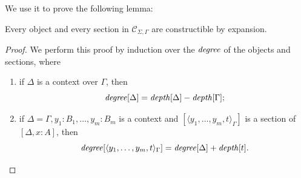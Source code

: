 We use it to prove the following lemma:
\begin{lemma} \label{lemma:exhaustivity-for-docs}
    Every object and every section in $\mathcal{C}_{\Sigma, \Gamma}$ are constructible by expansion.
\end{lemma}
\begin{proof}
    We perform this proof by induction over the $\operatorname{\mathit{degree}}$ of the objects and sections, where 
    \begin{enumerate}
        \item if $\Delta$ is a context over $\Gamma$, then \[
            \operatorname{\mathit{degree}}[\Delta] = \operatorname{\mathit{depth}}[\Delta] - \operatorname{\mathit{depth}}[\Gamma];
        \]
        \item if $\Delta = \Gamma, y_1 \colon B_1, \dots, y_m \colon B_m$ is a context and 
            $[\langle y_1, \dots, y_m, t \rangle_\Gamma]$ is a section of $[\Delta, x \colon A]$, then \[
                \operatorname{\mathit{degree}}[\langle y_1, \dots, y_m, t \rangle_\Gamma] = \operatorname{\mathit{degree}}[\Delta] + \operatorname{\mathit{depth}}[t].
            \]
    \end{enumerate}


\end{proof}
